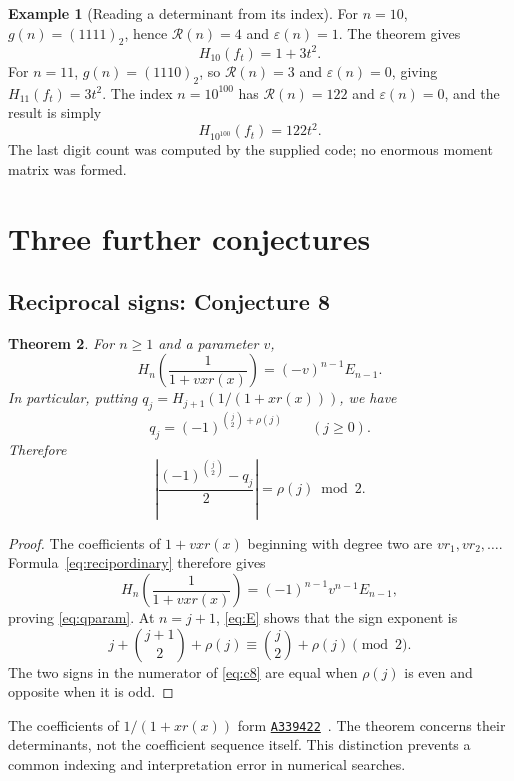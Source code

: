 \documentclass[11pt,a4paper]{article}
\numberwithin{equation}{section}
\newtheorem{theorem}{Theorem}[section]
\theoremstyle{definition}
\newtheorem{example}[theorem]{Example}
\theoremstyle{remark}
\newcommand{\Runs}{\mathcal R}
\newcommand{\Ones}{\rho}
\newcommand{\eps}{\varepsilon}
\newcommand{\oeis}[1]{\href{https://oeis.org/#1}{\texttt{#1}}}
\begin{document}
\begin{example}[Reading a determinant from its index]
For $n=10$, $g(n)=(1111)_2$, hence $\Runs(n)=4$ and $\eps(n)=1$.
The theorem gives
\[
 H_{10}(f_t)=1+3t^2.
\]
For $n=11$, $g(n)=(1110)_2$, so $\Runs(n)=3$ and $\eps(n)=0$, giving
$H_{11}(f_t)=3t^2$. The index $n=10^{100}$ has $\Runs(n)=122$ and
$\eps(n)=0$, and the result is simply
\[
 H_{10^{100}}(f_t)=122t^2.
\]
The last digit count was computed by the supplied code; no enormous
moment matrix was formed.
\end{example}



\section{Three further conjectures}\label{sec:three}

\subsection{Reciprocal signs: Conjecture 8}

\begin{theorem}\label{thm:recipsign}
For $n\ge1$ and a parameter $v$,
\begin{equation}\label{eq:qparam}
 H_n\!\left(\frac1{1+v x r(x)}\right)=(-v)^{n-1}E_{n-1}.
\end{equation}
In particular, putting $q_j=H_{j+1}(1/(1+xr(x)))$, we have
\begin{equation}\label{eq:qsign}
 q_j=(-1)^{\binom j2+\Ones(j)}\qquad(j\ge0).
\end{equation}
Therefore
\begin{equation}\label{eq:c8}
 \left|\frac{(-1)^{\binom j2}-q_j}{2}\right|
 =\Ones(j)\bmod2.
\end{equation}
\end{theorem}
\begin{proof}
The coefficients of $1+v x r(x)$ beginning with degree two are
$v r_1,v r_2,\ldots$. Formula~\eqref{eq:recipordinary} therefore gives
\[
 H_n\!\left(\frac1{1+v x r(x)}\right)
 =(-1)^{n-1}v^{n-1}E_{n-1},
\]
proving \eqref{eq:qparam}. At $n=j+1$, \eqref{eq:E} shows that the sign
exponent is
\[
 j+\binom{j+1}{2}+\Ones(j)
 \equiv\binom j2+\Ones(j)\pmod2.
\]
The two signs in the numerator of \eqref{eq:c8} are equal when
$\Ones(j)$ is even and opposite when it is odd.
\end{proof}

The coefficients of $1/(1+xr(x))$ form \oeis{A339422}~\cite{oeisreciprocal}.
The theorem concerns their determinants, not the coefficient sequence
itself. This distinction prevents a common indexing and interpretation
error in numerical searches.
\end{document}

